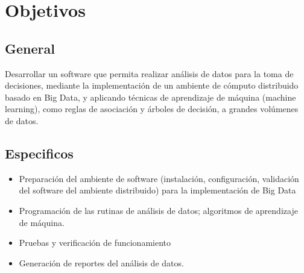 
\section{Objetivos}
\subsection{General}
Desarrollar un software que permita realizar análisis de datos para la toma de decisiones, mediante la implementación de un
ambiente de cómputo distribuido basado en Big Data, y aplicando técnicas de aprendizaje de máquina (machine
learning), como reglas de asociación y árboles de decisión, a grandes volúmenes de datos.
\subsection{Especificos}
\begin{itemize}
\item Preparación del ambiente de software (instalación, configuración, validación del software del ambiente distribuido) para la
implementación de Big Data
\item Programación de las rutinas de análisis de datos; algoritmos de aprendizaje de máquina.
\item Pruebas y verificación de funcionamiento
\item Generación de reportes del análisis de datos.
\end{itemize}